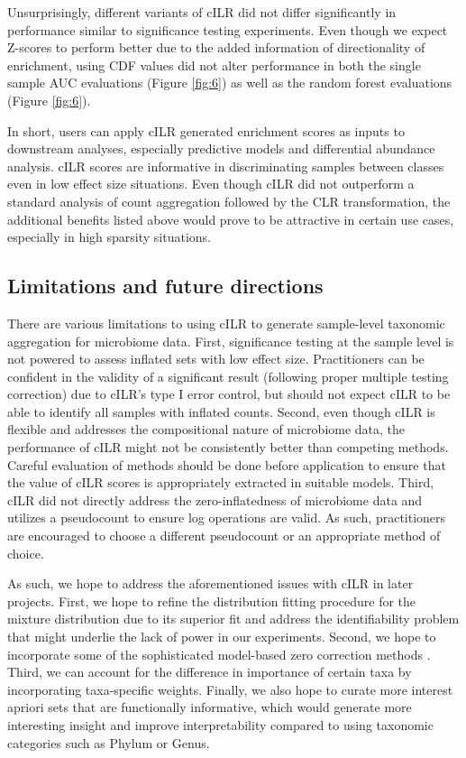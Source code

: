 \documentclass{article}
\begin{document}
Unsurprisingly, different variants of cILR did not differ significantly in performance similar to significance testing experiments. Even though we expect Z-scores to perform better due to the added information of directionality of enrichment, using CDF values did not alter performance in both the single sample AUC evaluations (Figure \ref{fig:6}) as well as the random forest evaluations (Figure \ref{fig:6}). 

In short, users can apply cILR generated enrichment scores as inputs to downstream analyses, especially predictive models and differential abundance analysis. cILR scores are informative in discriminating samples between classes even in low effect size situations. Even though cILR did not outperform a standard analysis of count aggregation followed by the CLR transformation, the additional benefits listed above would prove to be attractive in certain use cases, especially in high sparsity situations. 

\subsection*{Limitations and future directions}
There are various limitations to using cILR to generate sample-level taxonomic aggregation for microbiome data. First, significance testing at the sample level is not powered to assess inflated sets with low effect size. Practitioners can be confident in the validity of a significant result (following proper multiple testing correction) due to cILR's type I error control, but should not expect cILR to be able to identify all samples with inflated counts. Second, even though cILR is flexible and addresses the compositional nature of microbiome data, the performance of cILR might not be consistently better than competing methods. Careful evaluation of methods should be done before application to ensure that the value of cILR scores is appropriately extracted in suitable models. Third, cILR did not directly address the zero-inflatedness of microbiome data and utilizes a pseudocount to ensure log operations are valid. As such, practitioners are encouraged to choose a different pseudocount or an appropriate method of choice.   

As such, we hope to address the aforementioned issues with cILR in later projects. First, we hope to refine the distribution fitting procedure for the mixture distribution due to its superior fit and address the identifiability problem that might underlie the lack of power in our experiments. Second, we hope to incorporate some of the sophisticated model-based zero correction methods \cite{martin-fernandez2012,kaul2017a}. Third, we can account for the difference in importance of certain taxa by incorporating taxa-specific weights. Finally, we also hope to curate more interest apriori sets that are functionally informative, which would generate more interesting insight and improve interpretability compared to using taxonomic categories such as Phylum or Genus. 
\end{document}
